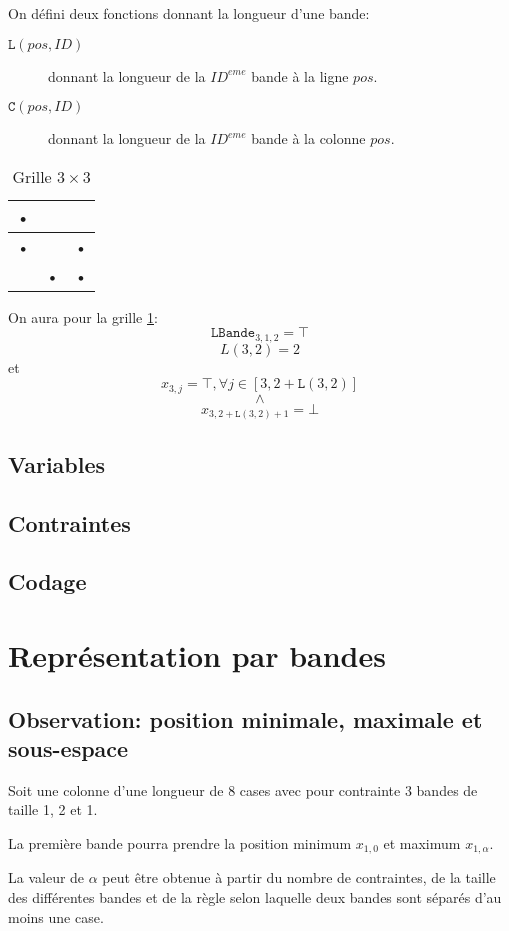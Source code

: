\documentclass[a4paper,12pt]{report}
\newcommand\black{\cellcolor{black}}
\begin{document}
On défini deux fonctions donnant la longueur d'une bande:
\begin{description}
\item[$\mathtt{L}(pos,ID)$] donnant la longueur de la $ID^{eme}$ bande à la ligne $pos$.
\item[$\mathtt{C}(pos,ID)$] donnant la longueur de la $ID^{eme}$ bande à la colonne $pos$.\\
\end{description} 

\begin{table}[H]
   \centering
	\begin{tabular}{|c|c|c|}
	\hline 
	\black• &  &  \\ 
	\hline 
	\black• &  & \black• \\ 
	\hline 
	 & \black• & \black• \\ 
	\hline 
	\end{tabular}
\caption{\label{Grille3X3} Grille $3\times3$}
\end{table}
On aura pour la grille \ref{Grille3X3}:
$$\mathtt{LBande}_{3,1,2} = \top$$
$$L(3,2) = 2$$
et\\
$$x_{3,j} = \top, \forall j \in [3,2+\mathtt{L}(3,2)]$$
$$\wedge$$
$$x_{3,2+\mathtt{L}(3,2)+1} = \bot  $$
\subsection{Variables}
\subsection{Contraintes}
\subsection{Codage}
\section{Représentation par bandes}
\subsection{Observation: position minimale, maximale et sous-espace}

Soit une colonne d'une longueur de 8 cases avec pour contrainte 3 bandes de taille 1, 2 et 1.

La première bande pourra prendre la position minimum $x_{1,0}$ et maximum $x_{1,\alpha}$.

La valeur de $\alpha$ peut être obtenue à partir du nombre de contraintes, de la taille des différentes bandes et de la règle selon laquelle deux bandes sont séparés d'au moins une case.\\
\end{document}
